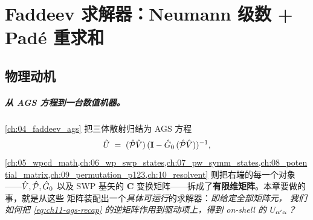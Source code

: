 
\providecommand{\Aker}{\mathbf{A}}                    %
\providecommand{\Kker}{\mathbf{K}}                    %
\providecommand{\Gker}{\mathbf{G}}                    %
\providecommand{\Iker}{\mathbf{I}}                    %
\providecommand{\Cker}{\mathbf{C}}                    %
\providecommand{\Pker}{\mathbf{P}}                    %
\providecommand{\Vker}{\mathbf{V}}                    %
\providecommand{\Uker}{\mathbf{U}}                    %
\providecommand{\Lker}{\mathbf{L}}                    %
\providecommand{\Rker}{\mathbf{R}}                    %
\providecommand{\Pade}[2]{P_{[#1/#2]}}                %
\providecommand{\rConv}{R_{\text{conv}}}              %
\providecommand{\PVon}{(\Pop\Vop)}                    %

\chapter{Faddeev 求解器：Neumann 级数 + Padé 重求和}
\label{ch:11_faddeev_solver}

\section{物理动机}
\label{sec:ch11-motivation}

\paragraph{从 AGS 方程到一台数值机器。}
\cref{ch:04_faddeev_ags} 把三体散射归结为 AGS 方程
\begin{equation}
\label{eq:ch11-ags-recap}
\Uop \;=\; \PVon\,(\Iker - \Gzero\,\PVon)^{-1},
\end{equation}
\cref{ch:05_wpcd_math,ch:06_wp_swp_states,ch:07_pw_symm_states,ch:08_potential_matrix,ch:09_permutation_p123,ch:10_resolvent}
则把右端的每一个对象——\(\hat{V}, \hat{\mathcal{P}}, \hat{G}_0\) 以及 SWP 基矢的 \(\Cker\)
变换矩阵——拆成了\textbf{有限维矩阵}。本章要做的事，就是从这些
矩阵装配出一个\emph{具体可运行}的求解器：\emph{即给定全部矩阵元，
我们如何把 \cref{eq:ch11-ags-recap} 的逆矩阵作用到驱动项上，得到
on-shell 的 \(U_{\alpha'\alpha}\)？}

